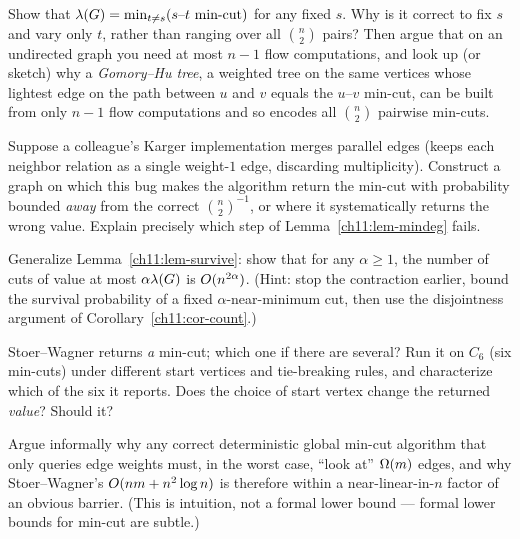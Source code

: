 \begin{exercise}\label{ch11:ex-flow}
Show that $\lambda(G)=\min_{t\neq s}(\text{$s$--$t$ min-cut})$ for any fixed $s$. Why is it correct to fix $s$ and vary only $t$, rather than ranging over all $\binom n2$ pairs? Then argue that on an undirected graph you need at most $n-1$ flow computations, and look up (or sketch) why a \emph{Gomory--Hu tree}, a weighted tree on the same vertices whose lightest edge on the path between $u$ and $v$ equals the $u$--$v$ min-cut, can be built from only $n-1$ flow computations and so encodes all $\binom n2$ pairwise min-cuts.
\end{exercise}

\begin{exercise}\label{ch11:ex-break}
Suppose a colleague's Karger implementation merges parallel edges (keeps each neighbor relation as a single weight-$1$ edge, discarding multiplicity). Construct a graph on which this bug makes the algorithm return the min-cut with probability bounded \emph{away} from the correct $\binom n2^{-1}$, or where it systematically returns the wrong value. Explain precisely which step of Lemma~\ref{ch11:lem-mindeg} fails.
\end{exercise}

\begin{exercise}\label{ch11:ex-near}
Generalize Lemma~\ref{ch11:lem-survive}: show that for any $\alpha\ge 1$, the number of cuts of value at most $\alpha\lambda(G)$ is $O(n^{2\alpha})$. (Hint: stop the contraction earlier, bound the survival probability of a fixed $\alpha$-near-minimum cut, then use the disjointness argument of Corollary~\ref{ch11:cor-count}.)
\end{exercise}

\begin{exercise}\label{ch11:ex-which}
Stoer--Wagner returns \emph{a} min-cut; which one if there are several? Run it on $C_6$ (six min-cuts) under different start vertices and tie-breaking rules, and characterize which of the six it reports. Does the choice of start vertex change the returned \emph{value}? Should it?
\end{exercise}

\begin{exercise}\label{ch11:ex-lower}
Argue informally why any correct deterministic global min-cut algorithm that only queries edge weights must, in the worst case, ``look at'' $\Omega(m)$ edges, and why Stoer--Wagner's $O(nm+n^2\log n)$ is therefore within a near-linear-in-$n$ factor of an obvious barrier. (This is intuition, not a formal lower bound --- formal lower bounds for min-cut are subtle.)
\end{exercise}
